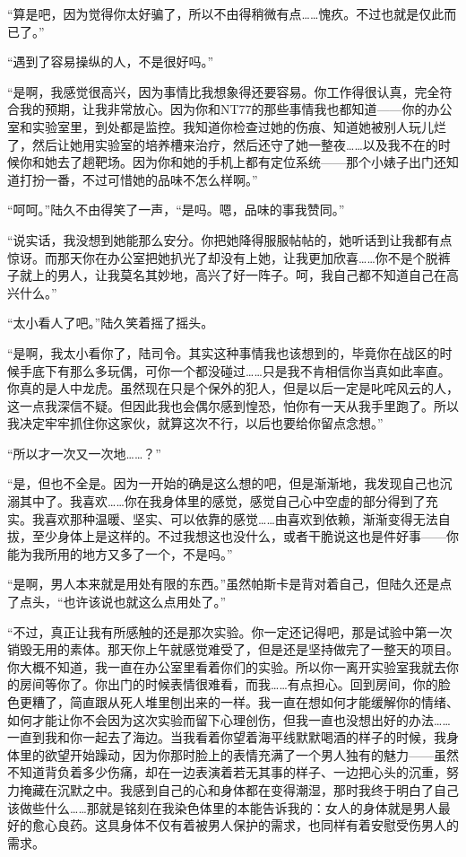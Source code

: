 “算是吧，因为觉得你太好骗了，所以不由得稍微有点……愧疚。不过也就是仅此而已了。”

“遇到了容易操纵的人，不是很好吗。”

“是啊，我感觉很高兴，因为事情比我想象得还要容易。你工作得很认真，完全符合我的预期，让我非常放心。因为你和NT77的那些事情我也都知道——你的办公室和实验室里，到处都是监控。我知道你检查过她的伤痕、知道她被别人玩儿烂了，然后让她用实验室的培养槽来治疗，然后还守了她一整夜……以及我不在的时候你和她去了趟靶场。因为你和她的手机上都有定位系统——那个小婊子出门还知道打扮一番，不过可惜她的品味不怎么样啊。”

“呵呵。”陆久不由得笑了一声，“是吗。嗯，品味的事我赞同。”

“说实话，我没想到她能那么安分。你把她降得服服帖帖的，她听话到让我都有点惊讶。而那天你在办公室把她扒光了却没有上她，让我更加欣喜……你不是个脱裤子就上的男人，让我莫名其妙地，高兴了好一阵子。呵，我自己都不知道自己在高兴什么。”

“太小看人了吧。”陆久笑着摇了摇头。

“是啊，我太小看你了，陆司令。其实这种事情我也该想到的，毕竟你在战区的时候手底下有那么多玩偶，可你一个都没碰过……只是我不肯相信你当真如此率直。你真的是人中龙虎。虽然现在只是个保外的犯人，但是以后一定是叱咤风云的人，这一点我深信不疑。但因此我也会偶尔感到惶恐，怕你有一天从我手里跑了。所以我决定牢牢抓住你这家伙，就算这次不行，以后也要给你留点念想。”

“所以才一次又一次地……？”

“是，但也不全是。因为一开始的确是这么想的吧，但是渐渐地，我发现自己也沉溺其中了。我喜欢……你在我身体里的感觉，感觉自己心中空虚的部分得到了充实。我喜欢那种温暖、坚实、可以依靠的感觉……由喜欢到依赖，渐渐变得无法自拔，至少身体上是这样的。不过我想这也没什么，或者干脆说这也是件好事——你能为我所用的地方又多了一个，不是吗。”

“是啊，男人本来就是用处有限的东西。”虽然帕斯卡是背对着自己，但陆久还是点了点头，“也许该说也就这么点用处了。”

“不过，真正让我有所感触的还是那次实验。你一定还记得吧，那是试验中第一次销毁无用的素体。那天你上午就感觉难受了，但是还是坚持做完了一整天的项目。你大概不知道，我一直在办公室里看着你们的实验。所以你一离开实验室我就去你的房间等你了。你出门的时候表情很难看，而我……有点担心。回到房间，你的脸色更糟了，简直跟从死人堆里刨出来的一样。我一直在想如何才能缓解你的情绪、如何才能让你不会因为这次实验而留下心理创伤，但我一直也没想出好的办法……一直到我和你一起去了海边。当我看着你望着海平线默默喝酒的样子的时候，我身体里的欲望开始躁动，因为你那时脸上的表情充满了一个男人独有的魅力——虽然不知道背负着多少伤痛，却在一边表演着若无其事的样子、一边把心头的沉重，努力掩藏在沉默之中。我感到自己的心和身体都在变得潮湿，那时我终于明白了自己该做些什么……那就是铭刻在我染色体里的本能告诉我的：女人的身体就是男人最好的愈心良药。这具身体不仅有着被男人保护的需求，也同样有着安慰受伤男人的需求。


